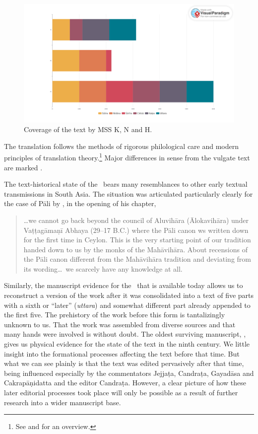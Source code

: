         \begin{figure}[t]
            \centering
            \includegraphics[width=\textwidth]{"media/MSS 1 visual paradigm.art"}
            \caption{Coverage of the text by MSS K, N and H.}
            \label{fig:mss-1-visual-paradigm}
        \end{figure}
        
    
    
The translation follows the methods of rigorous philological care and 
modern principles of translation theory.\footnote{See 
\cite[intro.]{wuja-2003} and \cite[81--83]{wuja-2021} for an overview.}  Major 
differences in sense from the vulgate text are marked  .

The text-historical state of the \SS\ bears many resemblances to other early 
textual transmissions in South Asia.  The situation was articulated particularly 
clearly for the case of Pāli by \citet{hinu-1978}, in the opening of his chapter, 
\begin{quote}
    \ldots we cannot go back beyond the council of Aluvihāra (Ālokavihāra) under 
    Vaṭṭagāmaṇī Abhaya (29--17 B.C.) where the Pāli canon ws written down for 
    the first time in Ceylon.  This is the very starting point of our tradition 
    handed down to us by the monks of the Mahāvihāra.  About recensions of 
    the Pāli canon different from the Mahāvihāra tradition and deviating from its 
    wording\ldots\ we scarcely have any knowledge at all.
\end{quote}
Similarly, the manuscript evidence for the \SS\ that is available
today allows us to reconstruct a version of the work after it was
consolidated into a text of five parts with a sixth or “later”
(\emph{uttara}) and somewhat different part already appended to the
first five.  The prehistory of the work before this form is
tantalizingly unknown to us.  That the work was assembled from
diverse sources and that many hands were involved is without doubt.
The oldest surviving manuscript, , gives us
physical evidence for the state of the text in the ninth century.  We
little insight into the formational processes affecting the text
before that time.  But what we can see plainly is that the text was
edited pervasively after that time, being influenced especially by
the commentators Jejjaṭa, Candraṭa, Gayadāsa and Cakrapāṇidatta and
the editor Candraṭa. However, a
clear picture of how these later editorial processes took place will only be 
possible as a result of further research into a wider manuscript base.